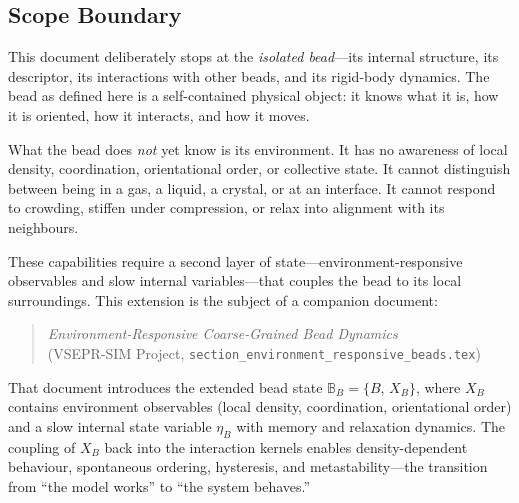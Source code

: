 \documentclass[11pt]{article}
\begin{document}
\subsection{Scope Boundary}

This document deliberately stops at the \emph{isolated bead}---its internal
structure, its descriptor, its interactions with other beads, and its
rigid-body dynamics.  The bead as defined here is a self-contained physical
object: it knows what it is, how it is oriented, how it interacts, and how
it moves.

What the bead does \emph{not} yet know is its environment.  It has no
awareness of local density, coordination, orientational order, or collective
state.  It cannot distinguish between being in a gas, a liquid, a crystal,
or at an interface.  It cannot respond to crowding, stiffen under
compression, or relax into alignment with its neighbours.

These capabilities require a second layer of state---environment-responsive
observables and slow internal variables---that couples the bead to its local
surroundings.  This extension is the subject of a companion document:

\begin{quote}
    \emph{Environment-Responsive Coarse-Grained Bead Dynamics} \\
    (VSEPR-SIM Project, \texttt{section\_environment\_responsive\_beads.tex})
\end{quote}

\noindent
That document introduces the extended bead state
$\mathbb{B}_B = \{B,\, X_B\}$, where $X_B$ contains environment
observables (local density, coordination, orientational order) and a slow
internal state variable $\eta_B$ with memory and relaxation dynamics.  The
coupling of $X_B$ back into the interaction kernels enables
density-dependent behaviour, spontaneous ordering, hysteresis, and
metastability---the transition from ``the model works'' to ``the system
behaves.''
\end{document}
